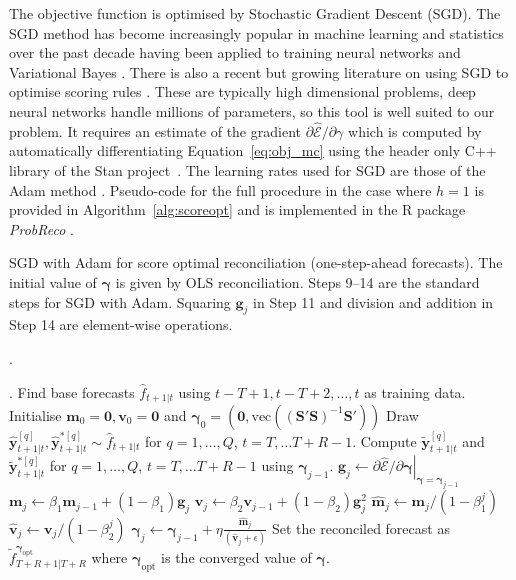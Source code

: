 \documentclass[a4paper,12pt]{article}
\theoremstyle{definition}
\begin{document}
The objective function is optimised by Stochastic Gradient Descent (SGD). The SGD method has become increasingly popular in machine learning and statistics over the past decade having been applied to training neural networks \citep{bottou2010} and Variational Bayes \citep{kingma2013}. There is also a recent but growing literature on using SGD to optimise scoring rules \citep[see][and references therein for examples]{GasEtAl2019,JanSte2020,HofEtAl2020}. These are typically high dimensional problems, deep neural networks handle millions of parameters, so this tool is well suited to our problem. It requires an estimate of the gradient $\partial\hat{\mathcal{E}}/\partial{\gamma}$ which is computed by automatically differentiating Equation~\eqref{eq:obj_mc} using the header only C++ library of the Stan project~\citep{carpenter2015}. The learning rates used for SGD are those of the Adam method \citep[see][for details]{kingma2014}. Pseudo-code for the full procedure in the case where $h=1$ is provided in Algorithm~\ref{alg:scoreopt} and is implemented in the R package \textit{ProbReco} \citep{RProbReco}.

\begin{algorithm}[!htb]
	\caption{SGD with Adam for score optimal reconciliation (one-step-ahead forecasts). The initial value of $\bm{\gamma}$ is given by OLS reconciliation. Steps 9--14 are the standard steps for SGD with Adam. Squaring $\bm{g}_j$ in Step 11 and division and addition in Step 14 are element-wise operations.}\label{alg:scoreopt}.
	\begin{algorithmic}[1]
		{\small
		.
		\State Find base forecasts $\hat{f}_{t+1|t}$ using $t-T+1,t-T+2,\ldots,t$ as training data.
		\EndFor
		\State Initialise $\bm{m}_0=\bm{0}, \bm{v}_0=\bm{0}$ and $\bm{\gamma}_0=\left(\bm{0},\text{vec}\left((\bm{S}'\bm{S})^{-1}\bm{S}'\right)\right)$
		\State Draw ${\hat{\bm{y}}}^{[q]}_{t+1|t},{\hat{\bm{y}}}^{*[q]}_{t+1|t}\sim \hat{f}_{t+1|t}$ for $q=1,\ldots,Q$, $t=T,\ldots T+R-1$.
		\State Compute $\tilde{\bm{y}}^{[q]}_{t+1|t}$ and $\tilde{\bm{y}}^{*[q]}_{t+1|t}$ for $q=1,\ldots,Q$, $t=T,\ldots T+R-1$ using $\bm{\gamma}_{j-1}$.
		\State $\bm{g}_j \gets \left.\partial\hat{\mathcal{E}}/\partial{\bm{\gamma}}\right|_{\bm{\gamma}=\bm{\gamma}_{j-1}}$ 
		\State $\bm{m}_j\gets\beta_1\bm{m}_{j-1}+(1-\beta_1)\bm{g}_j$ 
		\State $\bm{v}_j\gets\beta_2\bm{v}_{j-1}+(1-\beta_2)\bm{g}^2_j$ 
		\State $\hat{\bm{m}}_j\gets \bm{m}_j/(1-\beta_1^j)$ 
		\State $\hat{\bm{v}}_j\gets \bm{v}_j/(1-\beta_2^j)$ 
		\State $\bm{\gamma}_j\gets\bm{\gamma}_{j-1}+\eta\frac{\hat{\bm{m}}_j}{(\hat{\bm{v}}_j+\epsilon)}$ 
		\EndFor
		\State Set the reconciled forecast as $\tilde{f}^{\bm{\gamma}_{\text{opt}}}_{T+R+1|T+R}$ where $\bm{\gamma}_{\text{opt}}$ is the converged value of $\bm{\gamma}$.
		\EndProcedure
	}
	\end{algorithmic}
\end{algorithm}
\end{document}
